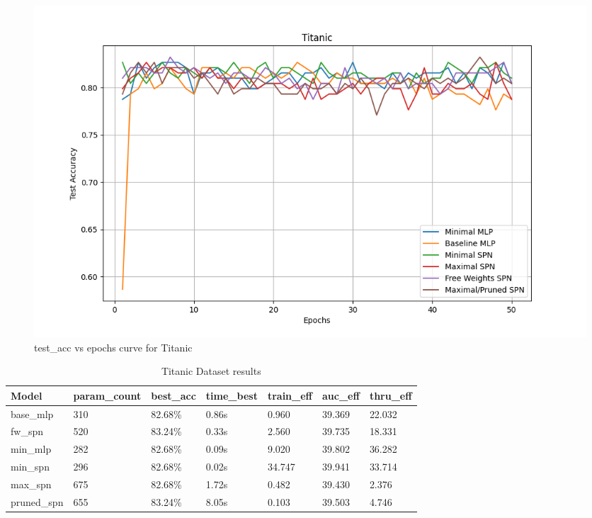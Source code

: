 \begin{figure}[H]
    \centering
    \includegraphics[width=\linewidth]{Figures/Results/Titanic/test_accuracy_plot.png} %
    \captionsetup{width=\linewidth}
    \caption{test\_acc vs epochs curve for Titanic}
    \label{fig:titanicTestCurve}
\end{figure}

\begin{table}[h!]
    \centering
    \caption{Titanic Dataset results}
    \begin{tabular}{|l|l|l|l|l|l|l|}
    \hline
    \textbf{Model} & \textbf{param\_count} & \textbf{best\_acc} & \textbf{time\_best} & \textbf{train\_eff} & \textbf{auc\_eff} & \textbf{thru\_eff} \\
    \hline
    base\_mlp & 310 & \cellcolor{red!25}82.68\% & 0.86s & 0.960 & \cellcolor{red!25}39.369 & 22.032 \\
    fw\_spn & 520 & \cellcolor{green!25}83.24\% & 0.33s & 2.560 & 39.735 & 18.331 \\
    min\_mlp & 282 & \cellcolor{red!25}82.68\% & 0.09s & 9.020 & 39.802 & \cellcolor{green!25}36.282 \\
    min\_spn & 296 & \cellcolor{red!25}82.68\% & \cellcolor{green!25}0.02s & \cellcolor{green!25}34.747 & \cellcolor{green!25}39.941 & 33.714 \\
    max\_spn & 675 & \cellcolor{red!25}82.68\% & 1.72s & 0.482 & 39.430 & \cellcolor{red!25}2.376 \\
    pruned\_spn & 655 & \cellcolor{green!25}83.24\% & \cellcolor{red!25}8.05s & \cellcolor{red!25}0.103 & 39.503 & 4.746 \\
    \hline
    \end{tabular}
    \label{tab:titanicResults}
\end{table}

